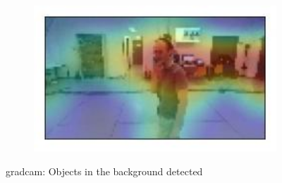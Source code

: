 \begin{figure}[!h]
\begin{center}
\begin{subfigure}[h]{0.24\textwidth}
		\end{subfigure}
		\hfill
		\begin{subfigure}[h]{0.24\textwidth}
			\centering
			\includegraphics[width=1\textwidth]{"contents/images/gradcam/gradcam-background-4"}
		\end{subfigure}
	\end{center}
	\vspace{-0.5cm}
	\caption[\gls{gradcam}: Objects in the background detected]{\gls{gradcam}: Objects in the background detected}
	\label{fig:gradcam-background}
\end{figure}


